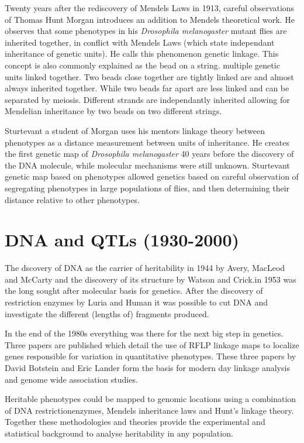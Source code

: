 Twenty years after the rediscovery of Mendels Laws in 1913, careful observations of 
Thomas Hunt Morgan introduces an addition to Mendels theoretical work. He observes 
that some phenotypes in his \emph{Drosophila melanogaster} mutant flies are inherited 
together, in conflict with Mendels Laws (which state independant inheritance of 
genetic units). He calls this phenomenon genetic linkage. This concept is also commonly 
explained as the bead on a string. multiple genetic units linked together. Two beads 
close together are tightly linked are and almost always inherited together. While 
two beads far apart are less linked and can be separated by meiosis. Different 
strands are independantly inherited allowing for Mendelian inheritance by two beads 
on two different strings.

Sturtevant a student of Morgan uses his mentors linkage theory between phenotypes 
as a distance measurement between units of inheritance. He creates the first genetic 
map of \emph{Drosophila melanogaster} 40 years before the discovery of the DNA molecule, 
while molecular mechanisms were still unknown. Sturtevant genetic map based on 
phenotypes allowed genetics based on careful observation of segregating phenotypes in 
large populations of flies, and then determining their distance relative to other 
phenotypes.

\section{DNA and QTLs (1930-2000)}

The dscovery of DNA as the carrier of heritability in 1944 by Avery, MacLeod and McCarty 
\cite{Avery:1944} and the discovery of its structure by Watson and Crick.in 1953 
\cite{Watson:1953} was the long sought after molecular basis for genetics. After the 
discovery of restriction enzymes by Luria and Human \cite{Luria:1952} it was possible 
to cut DNA and investigate the different (lengths of) fragments produced.

In the end of the 1980s everything was there for the next big step in genetics. Three 
papers are published which detail the use of RFLP linkage maps to localize genes 
responsible for variation in quantitative phenotypes. These three papers by David Botstein 
and Eric Lander \cite{Lander:1986, Lander:1987, Lander:1989} form the basis for modern 
day linkage analysis and genome wide association studies. 

Heritable phenotypes could be mapped to genomic locations using a combination of DNA 
restrictionenzymes, Mendels inheritance laws and Hunt's linkage theory. Together these 
methodologies and theories provide the experimental and statistical background to 
analyse heritability in any population.

